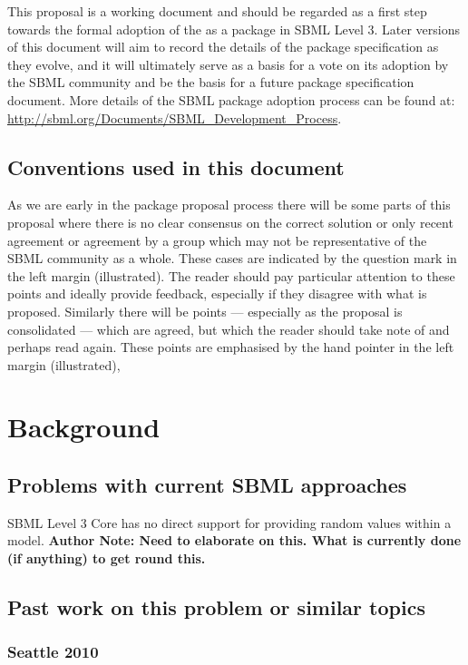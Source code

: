 \documentclass[draftspec]{sbmlpkgspec}
\begin{document}
This proposal is a working document and should be regarded as a first
step towards the formal adoption of the \distribshort as a package in
SBML Level 3. Later versions of this document will aim to record the
details of the package specification as they evolve, and it will
ultimately serve as a basis for a vote on its adoption by the SBML
community and be the basis for a future package specification
document. More details of the SBML package adoption process can be
found at: \url{http://sbml.org/Documents/SBML_Development_Process}.

\subsection{Conventions used in this document}

As we are early in the package proposal process there will be some
parts of this proposal where there is no clear consensus on the
correct solution or only recent agreement or agreement by a group
which may not be representative of the SBML community as a
whole. These cases are indicated by the \contraversial question mark
in the left margin (illustrated). The reader should pay particular attention to these
points and ideally provide feedback, especially if they disagree with
what is proposed. Similarly there will be points --- especially as the
proposal is consolidated --- which are agreed, but which the reader
should take note of and perhaps read again. These points \watchout are
emphasised by the hand pointer in the left margin (illustrated),

\section{Background}

\subsection{Problems with current SBML approaches}

SBML Level 3 Core has no direct support for providing random values
within a model. \textbf{Author Note: Need to elaborate on this. What
  is currently done (if anything) to get round this.}

\subsection{Past work on this problem or similar topics}

\subsubsection{Seattle 2010}
\end{document}
